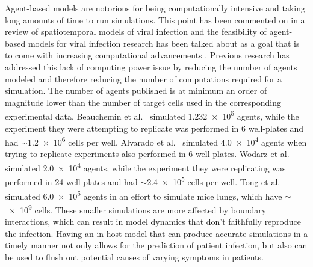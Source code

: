 Agent-based models are notorious for being computationally intensive and taking long amounts of time to run simulations. This point has been commented on in a review of spatiotemporal models of viral infection \citep{gallagher_causes_2018} and the feasibility of agent-based models for viral infection research has been talked about as a goal that is to come with increasing computational advancements \citep{bauer_agent-based_2009}. Previous research has addressed this lack of computing power issue by reducing the number of agents modeled and therefore reducing the number of computations required for a simulation. The number of agents published is at minimum an order of magnitude lower than the number of target cells used in the corresponding experimental data. Beauchemin et al.\ \citep{beauchemin_simple_2005} simulated \num{1.232e5} agents, while the experiment they were attempting to replicate was performed in 6 well-plates and had $\sim$\num{1.2e6} cells per well. Alvarado et al.\ \citep{alvarado_cellular-level_2018} simulated \num{4.0e4} agents when trying to replicate experiments also performed in 6 well-plates. Wodarz et al.\ \citep{wodarz_laws_2014} simulated \num{2.0e4} agents, while the experiment they were replicating was performed in 24 well-plates and had $\sim$\num{2.4e5} cells per well. Tong et al.\ \citep{tong_development_2015} simulated \num{6.0e5} agents in an effort to simulate mice lungs, which have $\sim$\num{e9} cells. These smaller simulations are more affected by boundary interactions, which can result in model dynamics that don't faithfully reproduce the infection. Having an in-host model that can produce accurate simulations in a timely manner not only allows for the prediction of patient infection, but also can be used to flush out potential causes of varying symptoms in patients. 

